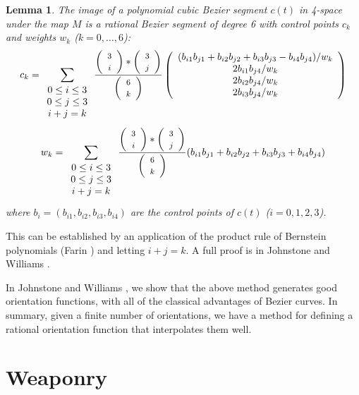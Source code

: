 \documentclass[times]{article}
\newcommand{\QED}{\vrule height 1.4ex width 1.0ex depth -.1ex\ } %
\newcommand{\prf}{\noindent{{\bf Proof} :\ }}
\newcommand{\choice}[2]{\left( \begin{array}{c} \mbox{\footnotesize{$#1$}} \\ \mbox{\footnotesize{$#2$}} \end{array} \right)}
\newtheorem{lemma}{Lemma}[section]
\begin{document}
\begin{lemma}
\label{sextic}
The image of a polynomial cubic Bezier segment $c(t)$ in 4-space 
under the map $M$
is a rational Bezier segment of degree 6 with control points $c_k$
and weights $w_k$ ($k = 0, \ldots, 6$):
\begin{equation}
\label{eq:control-pts}
c_k = \sum_{\begin{array}{c} 0 \leq i \leq 3 \\ 
			     0 \leq j \leq 3 \\ 
			     i+j=k
			     \end{array}} 
        \frac{\choice{3}{i} * \choice{3}{j}}{\choice{6}{k}}
	\left( \begin{array}{c}
            (b_{i1} b_{j1} + b_{i2} b_{j2} + b_{i3} b_{j3} - b_{i4} b_{j4}) / w_k \\
            2b_{i1} b_{j4} / w_k \\
            2b_{i2} b_{j4} / w_k \\
            2b_{i3} b_{j4} / w_k
	\end{array} \right)
\end{equation}
\begin{equation}
w_k = \sum_{\begin{array}{c} 0 \leq i \leq 3 \\ 
			     0 \leq j \leq 3 \\ 
			     i+j=k
			     \end{array}}
        \frac{\choice{3}{i} * \choice{3}{j}}{\choice{6}{k}}
	(b_{i1} b_{j1} + b_{i2} b_{j2} + b_{i3} b_{j3} + b_{i4} b_{j4})
\end{equation}
where $b_i = (b_{i1},b_{i2},b_{i3},b_{i4})$ are the control points of $c(t)$
($i=0,1,2,3$).
\end{lemma}
\prf
This can be established by an application of the product rule
of Bernstein polynomials (Farin \cite{farin93})
and letting $i+j=k$.
A full proof is in Johnstone and Williams \cite{jjjimbo94a}.
\QED

In Johnstone and Williams \cite{jjjimbo94a}, we show that the above
method generates good orientation functions, with all of the classical
advantages of Bezier curves.
In summary, given a finite number of orientations, we have a method
for defining a rational orientation function that interpolates them well.


\section{Weaponry}
\label{sec:weapon}
\end{document}
